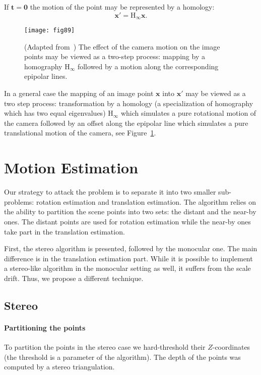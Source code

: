 If $\mathbf{t} = \mathbf{0}$ the motion of the point may be represented by a homology:
\begin{equation}
\mathbf{x}' = \mathrm{H_\infty}\mathbf{x}.
\end{equation}

\begin{figure}[h]
  \centering
  \texttt{[image: fig89]}
  \caption{(Adapted from~\cite{Hartley2004}) The effect of the camera motion on
    the image points may be viewed as a two-step process: mapping by a
    homography $\mathrm{H_\infty}$ followed by a motion along the corresponding
    epipolar lines.}
  \label{fig:two_step_motion}
\end{figure}

In a general case the mapping of an image point $\mathbf{x}$ into
$\mathbf{x}'$ may be viewed as a two step process: transformation by a
homology (a specialization of homography which has two equal
eigenvalues) $\mathrm{H_\infty}$ which simulates a pure rotational
motion of the camera followed by an offset along the epipolar line
which simulates a pure translational motion of the camera, see Figure~\ref{fig:two_step_motion}.

\section{Motion Estimation}\label{sec:moest}

Our strategy to attack the problem is to separate it into two smaller
sub-problems: rotation estimation and translation estimation. The
algorithm relies on the ability to partition the scene points into two
sets: the distant and the near-by ones.  The distant points are used
for rotation estimation while the near-by ones take part in the
translation estimation.

First, the stereo algorithm is presented, followed by the monocular
one.  The main difference is in the translation estimation part. While
it is possible to implement a stereo-like algorithm in the monocular
setting as well, it suffers from the scale drift.  Thus, we propose a
different technique.


\subsection{Stereo}\label{sec:stereo_moest}
\paragraph{Partitioning the points} To partition the points in the
stereo case we hard-threshold their $Z$-coordinates (the threshold is
a parameter of the algorithm).  The depth of the points was computed
by a stereo triangulation.

